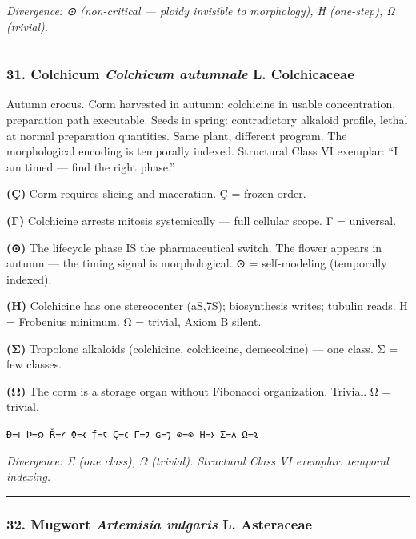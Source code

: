 \emph{Divergence: ⊙ (non-critical --- ploidy invisible to morphology), Ħ
(one-step), Ω (trivial).}

\begin{center}\rule{0.5\linewidth}{0.5pt}\end{center}

\hypertarget{colchicum-colchicum-autumnale-l.-colchicaceae}{%
\subsubsection{\texorpdfstring{31. Colchicum \textbar{} \emph{Colchicum
autumnale} L. \textbar{}
Colchicaceae}{31. Colchicum \textbar{} Colchicum autumnale L. \textbar{} Colchicaceae}}\label{colchicum-colchicum-autumnale-l.-colchicaceae}}

Autumn crocus. Corm harvested in autumn: colchicine in usable
concentration, preparation path executable. Seeds in spring:
contradictory alkaloid profile, lethal at normal preparation quantities.
Same plant, different program. The morphological encoding is temporally
indexed. Structural Class VI exemplar: ``I am timed --- find the right
phase.''

\textbf{(Ç)} Corm requires slicing and maceration. Ç = frozen-order.

\textbf{(Γ)} Colchicine arrests mitosis systemically --- full cellular
scope. Γ = universal.

\textbf{(⊙)} The lifecycle phase IS the pharmaceutical switch. The
flower appears in autumn --- the timing signal is morphological. ⊙ =
self-modeling (temporally indexed).

\textbf{(Ħ)} Colchicine has one stereocenter (aS,7S); biosynthesis
writes; tubulin reads. Ħ = Frobenius minimum. Ω = trivial, Axiom B
silent.

\textbf{(Σ)} Tropolone alkaloids (colchicine, colchiceine, demecolcine)
--- one class. Σ = few classes.

\textbf{(Ω)} The corm is a storage organ without Fibonacci organization.
Trivial. Ω = trivial.

\texttt{Ð=𐑦\ Þ=𐑸\ Ř=𐑾\ Φ=𐑬\ ƒ=𐑱\ Ç=𐑤\ Γ=𐑲\ ɢ=𐑠\ ⊙=⊙\ Ħ=𐑶\ Σ=𐑵\ Ω=𐑷}

\emph{Divergence: Σ (one class), Ω (trivial). Structural Class VI
exemplar: temporal indexing.}

\begin{center}\rule{0.5\linewidth}{0.5pt}\end{center}

\hypertarget{mugwort-artemisia-vulgaris-l.-asteraceae}{%
\subsubsection{\texorpdfstring{32. Mugwort \textbar{} \emph{Artemisia
vulgaris} L. \textbar{}
Asteraceae}{32. Mugwort \textbar{} Artemisia vulgaris L. \textbar{} Asteraceae}}\label{mugwort-artemisia-vulgaris-l.-asteraceae}}

